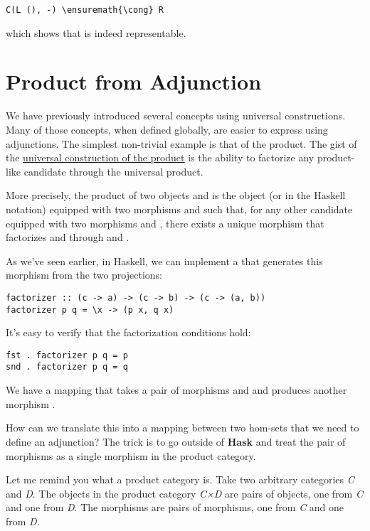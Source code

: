 \begin{Verbatim}[commandchars=\\\{\}]
C(L (), -) \ensuremath{\cong} R
\end{Verbatim}
which shows that  is indeed representable.

\section{Product from Adjunction}\label{product-from-adjunction}

We have previously introduced several concepts using universal
constructions. Many of those concepts, when defined globally, are easier
to express using adjunctions. The simplest non-trivial example is that
of the product. The gist of the \hyperref[products-and-coproducts]{universal
construction of the product} is the ability to factorize any
product-like candidate through the universal product.

More precisely, the product of two objects  and  is
the object  (or  in the Haskell
notation) equipped with two morphisms  and  such
that, for any other candidate  equipped with two morphisms
 and , there
exists a unique morphism  that
factorizes  and  through  and
.

As we've seen earlier, in Haskell, we can implement a  that generates this
morphism from the two projections:

\begin{Verbatim}
factorizer :: (c -> a) -> (c -> b) -> (c -> (a, b))
factorizer p q = \x -> (p x, q x)
\end{Verbatim}
It's easy to verify that the factorization conditions hold:

\begin{Verbatim}[commandchars=\\\{\}]
fst . factorizer p q = p
snd . factorizer p q = q
\end{Verbatim}
We have a mapping that takes a pair of morphisms  and
 and produces another morphism
.

How can we translate this into a mapping between two hom-sets that we
need to define an adjunction? The trick is to go outside of
\textbf{Hask} and treat the pair of morphisms as a single morphism in
the product category.

Let me remind you what a product category is. Take two arbitrary
categories \emph{C} and \emph{D}. The objects in the product category
\emph{C×D} are pairs of objects, one from \emph{C} and one from
\emph{D}. The morphisms are pairs of morphisms, one from \emph{C} and
one from \emph{D}.

